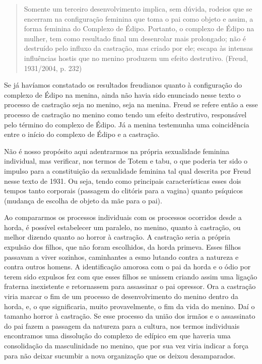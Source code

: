 \begin{quote}
Somente um terceiro desenvolvimento implica, sem dúvida, rodeios que se
encerram na configuração feminina que toma o pai como objeto e assim, a
forma feminina do Complexo de Édipo. Portanto, o complexo de Édipo na
mulher, tem como resultado final um desenrolar mais prolongado; não é
destruído pelo influxo da castração, mas criado por ele; escapa às
intensas influências hostis que no menino produzem um efeito destrutivo.
(Freud, 1931/2004, p. 232)
\end{quote}

Se já havíamos constatado os resultados freudianos quanto à configuração
do complexo de Édipo na menina, ainda não havia sido enunciado nesse
texto o processo de castração seja no menino, seja na menina. Freud se
refere então a esse processo de castração no menino como tendo um efeito
destrutivo, responsável pelo término do complexo de Édipo. Já a menina
testemunha uma coincidência entre o início do complexo de Édipo e a
castração.

Não é nosso propósito aqui adentrarmos na própria sexualidade feminina
individual, mas verificar, nos termos de Totem e tabu, o que poderia ter
sido o impulso para a constituição da sexualidade feminina tal qual
descrita por Freud nesse texto de 1931. Ou seja, tendo como principais
características esses dois tempos tanto corporais (passagem do clitóris
para a vagina) quanto psíquicos (mudança de escolha de objeto da mãe
para o pai).

Ao compararmos os processos individuais com os processos ocorridos desde
a horda, é possível estabelecer um paralelo, no menino, quanto à
castração, ou melhor dizendo quanto ao horror à castração. A castração
seria a própria expulsão dos filhos, que não foram escolhidos, da horda
primeva. Esses filhos passavam a viver sozinhos, caminhantes a esmo
lutando contra a natureza e contra outros homens. A identificação
amorosa com o pai da horda e o ódio por terem sido expulsos fez com que
esses filhos se unissem criando assim uma ligação fraterna inexistente e
retornassem para assassinar o pai opressor. Ora a castração viria marcar
o fim de um processo de desenvolvimento do menino dentro da horda, e, o
que significaria, muito provavelmente, o fim da vida do menino. Daí o
tamanho horror à castração. Se esse processo da união dos irmãos e o
assassinato do pai fazem a passagem da natureza para a cultura, nos
termos individuais encontramos uma dissolução do complexo de edípico em
que haveria uma consolidação da masculinidade no menino, que por sua vez
viria indicar a força para não deixar sucumbir a nova organização que os
deixou desamparados.

